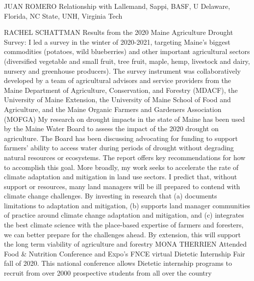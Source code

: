 \documentclass[11pt]{article}
\begin{document}
\begin{description}[topsep=0pt, noitemsep]
\begin{description}[topsep=11pt, noitemsep]
JUAN ROMERO Relationship with Lallemand, Sappi, BASF, U Delaware, Florida, NC State, UNH, Virginia Tech

RACHEL SCHATTMAN Results from the 2020 Maine Agriculture Drought Survey: I led a survey in the winter of 2020-2021, targeting Maine’s biggest commodities (potatoes, wild blueberries) and other important agricultural sectors (diversified vegetable and small fruit, tree fruit, maple, hemp, livestock and dairy, nursery and greenhouse producers). The survey instrument was collaboratively developed by a team of agricultural advisors and service providers from the Maine Department of Agriculture, Conservation, and Forestry (MDACF), the University of Maine Extension, the University of Maine School of Food and Agriculture, and the Maine Organic Farmers and Gardeners Association (MOFGA)
My research on drought impacts in the state of Maine has been used by the Maine Water Board to assess the impact of the 2020 drought on agriculture. The Board
has been discussing advocating for funding to support farmers' ability to access water during periods of drought without degrading natural resources or ecosystems.  The report offers key recommendations for how to accomplish this goal.  More broadly, my work seeks to accelerate the rate of climate adaptation and mitigation in land use sectors. I predict that, without support or resources, many land managers will be ill prepared to contend with climate change challenges. By investing in research that (a) documents limitations to adaptation and mitigation, (b) supports land manager communities of practice around climate change adaptation and mitigation, and (c) integrates the best climate science with the place-based expertise of farmers and foresters, we can better prepare for the challenges ahead. By extension, this will support the long term viability of agriculture and forestry
MONA THERRIEN Attended Food \& Nutrition Conference and Expo's FNCE virtual Dietetic Internship Fair fall of 2020. This national conference allows Dietetic internship programs to recruit from over 2000 prospective students from all over the country

\end{description}
\end{description}
\end{document}
